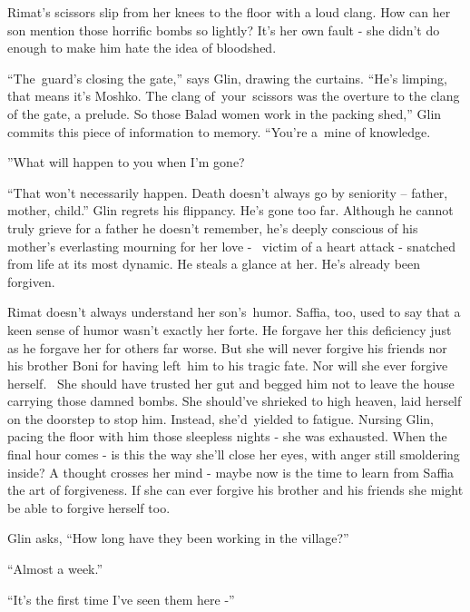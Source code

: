 \documentclass[letterpaper]{article}
\begin{document}
Rimat's scissors slip from her knees to the floor with a loud clang. How can her son mention those horrific bombs so
lightly? It's her own fault - she didn't do enough to make him hate the idea of bloodshed.

{}``The~guard's closing the gate,'' says Glin, drawing the curtains. ``He's limping, that means it's Moshko. The clang
of~your~scissors was the overture to the clang of the gate, a prelude. So those Balad women work in the packing shed,''
Glin commits this piece of information to memory. ``You're a~mine of knowledge.{\textquotedbl}

{}''What will happen to you when I'm gone?{\textquotedbl}

{}``That won't necessarily happen. Death doesn't always go by seniority -- father, mother, child.'' Glin regrets his
flippancy. He's gone too far. Although he cannot truly grieve for a father he doesn't remember, he's deeply conscious
of his mother's everlasting mourning for her love - \ victim of a heart attack - snatched from life at its most
dynamic. He steals a glance at her. He's already been forgiven.

\textcolor[rgb]{0.13333334,0.13333334,0.13333334}{Rimat doesn't always understand her son's~humor. Saffia, too, used to
say that a keen sense of humor wasn't exactly her forte. }He forgave her this deficiency just as he forgave her for
others far worse. But she will never forgive his friends nor his brother Boni for having left~him to his tragic fate.
Nor will she ever forgive herself.~ She should have trusted her gut and begged him not to leave the house carrying
those damned bombs. She should've shrieked to high heaven, laid herself on the doorstep to stop him. Instead,
she'd~yielded to fatigue. Nursing Glin, pacing the floor with him those sleepless nights - she was exhausted. When the
final hour comes - is this the way she'll close her eyes, with anger still smoldering inside? A thought crosses her
mind - maybe now is the time to learn from Saffia the art of forgiveness. If she can ever forgive his brother
and\textcolor[rgb]{0.13333334,0.13333334,0.13333334}{ his friends she might be able to forgive herself too. }

\textcolor[rgb]{0.13333334,0.13333334,0.13333334}{Glin asks, ``How long have they been working in the village?'' }

\textcolor[rgb]{0.13333334,0.13333334,0.13333334}{{}``Almost a week.'' }

\textcolor[rgb]{0.13333334,0.13333334,0.13333334}{{}``It's the first time I've seen them here -'' }
\end{document}
